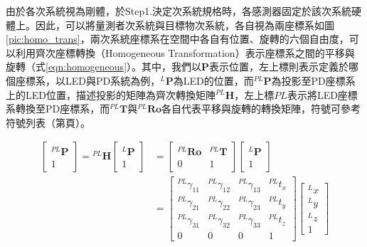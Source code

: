     由於各次系統視為剛體，於Step1.決定次系統規格時，各感測器固定於該次系統硬體上。因此，可以將量測者次系統與目標物次系統，各自視為兩座標系如圖\ref{pic:homo_trans}，兩次系統座標系在空間中各自有位置、旋轉的六個自由度，可以利用齊次座標轉換（Homogeneous Transformation）表示座標系之間的平移與旋轉（式\ref{eqn:homogeneous}）。其中，我們以$\boldsymbol{P}$表示位置，左上標則表示定義於哪個座標系，以LED與PD系統為例，$^{L}\boldsymbol{P}$為LED的位置，而$^{PL}\boldsymbol{P}$為投影至PD座標系上的LED位置，描述投影的矩陣為齊次轉換矩陣$^{PL}\boldsymbol{H}$，左上標$PL$表示將LED座標系轉換至PD座標系，而$^{PL}\boldsymbol{T}$與$^{PL}\boldsymbol{Ro}$各自代表平移與旋轉的轉換矩陣，符號可參考符號列表（第\pageref{chp:symbol}頁）。

    
    
    
    
  

    \begin{equation}
        \label{eqn:homogeneous}
        \begin{aligned}
        {\left[\begin{array}{c}
        { }^{P L} \boldsymbol{P} \\
        1
        \end{array}\right]={ }^{P L} \boldsymbol{H}\left[\begin{array}{c}
        { }^{L} \boldsymbol{P} \\
        1
        \end{array}\right] } &=\left[\begin{array}{cc}
        { }^{P L} \boldsymbol{R} \boldsymbol{o} & { }^{P L} \boldsymbol{T} \\
        0 & 1
        \end{array}\right]\left[\begin{array}{c}
        { }^{L} \boldsymbol{P} \\
        1
        \end{array}\right] \\
        &=\left[\begin{array}{cccc}
        { }^{P L} \gamma_{11} & { }^{P L} \gamma_{12} & { }^{P L} \gamma_{13} & { }^{P L} {t}_{x} \\
        { }^{P L} \gamma_{21} & ^{P L } \gamma_{22} & { }^{P L} \gamma_{23} & { }^{P L} {t}_{y} \\
        { }^{P L} \gamma_{31} & ^{P L} \gamma_{32} & { }^{P L} \gamma_{33} & { }^{P L} {t}_{z} \\
        0 & 0 & 0 & 1
        \end{array}\right]\left[\begin{array}{c}
        { }^{L} {x} \\
        { }^{L} {y} \\
        { }^{L} z \\
        1
        \end{array}\right]
        \end{aligned}
    \end{equation}


